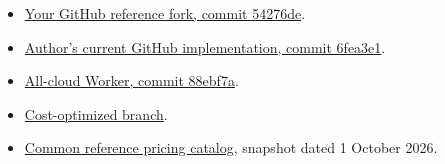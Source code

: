 \documentclass[11pt,a4paper]{article}
\begin{document}
\begin{itemize}
\item \href{https://github.com/Tew12345678910/ChemEagle/tree/54276de6a7d3210e4f4d42f605cb6b17bfd5d1ba}{Your GitHub reference fork, commit 54276de}.
\item \href{https://github.com/CYF2000127/ChemEagle/tree/6fea3e1f1fcb54803471522b3327c6ef15a88063}{Author's current GitHub implementation, commit 6fea3e1}.
\item \href{https://github.com/Tew12345678910/ChemEagle-Cloud/tree/88ebf7a2080a4ab3ab22c7101cf67e9c1de407e1/cloud_worker}{All-cloud Worker, commit 88ebf7a}.
\item \href{https://github.com/Tew12345678910/ChemEagle/tree/mathus/chemeagle-cost-optimized}{Cost-optimized branch}.
\item \href{https://openrouter.ai/api/v1/models}{Common reference pricing catalog}, snapshot dated 1 October 2026.
\end{itemize}
\end{document}

